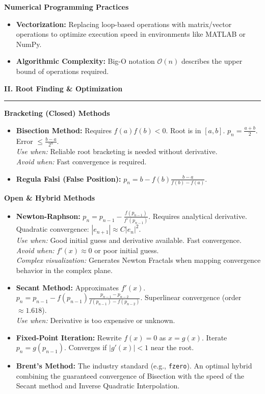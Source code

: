 \documentclass[10pt, landscape, twocolumn]{article}
\newcommand{\cheatsheetsection}[1]{
    \vspace{0.6em}
    {\color{themeblue}\large\bfseries #1} \par
    \vspace{-0.5em}
    {\color{themeblue}\rule{\linewidth}{1pt}} \par
    \vspace{0.2em}
}
\newcommand{\cheatsheetsubsection}[1]{
    \vspace{0.4em}
    {\color{themeblue}\normalsize\bfseries #1} \par
    \vspace{0.1em}
}
\begin{document}
\cheatsheetsubsection{Numerical Programming Practices}
\begin{itemize}[leftmargin=*, nosep]
    \item \textbf{Vectorization:} Replacing loop-based operations with matrix/vector operations to optimize execution speed in environments like MATLAB or NumPy.
    \item \textbf{Algorithmic Complexity:} Big-O notation $\mathcal{O}(n)$ describes the upper bound of operations required.
\end{itemize}

\cheatsheetsection{II. Root Finding \& Optimization}

\cheatsheetsubsection{Bracketing (Closed) Methods}
\begin{itemize}[leftmargin=*, nosep]
    \item \textbf{Bisection Method:} Requires $f(a)f(b) < 0$. Root is in $[a,b]$.
    $p_n = \frac{a+b}{2}$. Error $\leq \frac{b-a}{2^n}$. \\
    \textit{Use when:} Reliable root bracketing is needed without derivative. \\
    \textit{Avoid when:} Fast convergence is required.
    \item \textbf{Regula Falsi (False Position):} $p_n = b - f(b)\frac{b-a}{f(b)-f(a)}$.
\end{itemize}

\cheatsheetsubsection{Open \& Hybrid Methods}
\begin{itemize}[leftmargin=*, nosep]
    \item \textbf{Newton-Raphson:} $p_n = p_{n-1} - \frac{f(p_{n-1})}{f'(p_{n-1})}$. 
    Requires analytical derivative. Quadratic convergence: $|e_{n+1}| \approx C |e_n|^2$. \\
    \textit{Use when:} Good initial guess and derivative available. Fast convergence. \\
    \textit{Avoid when:} $f'(x) \approx 0$ or poor initial guess. \\
    \textit{Complex visualization:} Generates Newton Fractals when mapping convergence behavior in the complex plane.
    \item \textbf{Secant Method:} Approximates $f'(x)$.
    $p_n = p_{n-1} - f(p_{n-1})\frac{p_{n-1}-p_{n-2}}{f(p_{n-1})-f(p_{n-2})}$. 
    Superlinear convergence (order $\approx 1.618$). \\
    \textit{Use when:} Derivative is too expensive or unknown.
    \item \textbf{Fixed-Point Iteration:} Rewrite $f(x)=0$ as $x = g(x)$. Iterate $p_n = g(p_{n-1})$. Converges if $|g'(x)| < 1$ near the root.
    \item \textbf{Brent's Method:} The industry standard (e.g., \texttt{fzero}). An optimal hybrid combining the guaranteed convergence of Bisection with the speed of the Secant method and Inverse Quadratic Interpolation.
\end{itemize}
\end{document}
